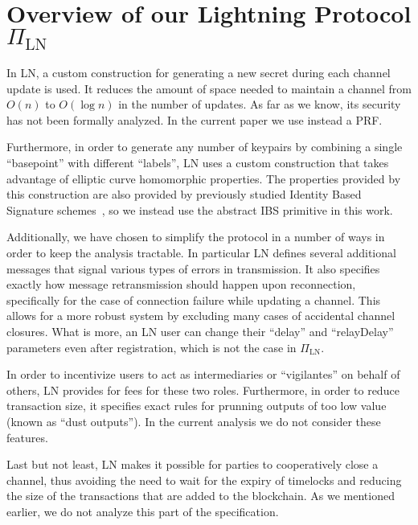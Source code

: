 \section{Overview of our Lightning Protocol $\Pi_{\mathrm{LN}}$}

  \begin{remark}

    In LN, a custom construction for generating a new secret during each channel
    update is used. It reduces the amount of space needed to maintain a channel
    from $O(n)$ to $O(\log n)$ in the number of updates. As far as we know, its
    security has not been formally analyzed. In the current paper we use instead
    a PRF.

    Furthermore, in order to generate any number of keypairs by combining a
    single ``basepoint'' with different ``labels'', LN uses a custom
    construction that takes advantage of elliptic curve homomorphic properties.
    The properties provided by this construction are also provided by previously
    studied Identity Based Signature schemes~\cite{ibsshamir,ibspaterson}, so we
    instead use the abstract IBS primitive in this work. 

    Additionally, we have chosen to simplify the protocol in a number of ways in
    order to keep the analysis tractable. In particular LN defines several
    additional messages that signal various types of errors in transmission. It
    also specifies exactly how message retransmission should happen upon
    reconnection, specifically for the case of connection failure while updating
    a channel. This allows for a more robust system by excluding many cases of
    accidental channel closures. What is more, an LN user can change their
    ``delay'' and ``relayDelay'' parameters even after registration, which is
    not the case in $\Pi_{\mathrm{LN}}$.

    In order to incentivize users to act as intermediaries or ``vigilantes'' on
    behalf of others, LN provides for fees for these two roles. Furthermore, in
    order to reduce transaction size, it specifies exact rules for prunning
    outputs of too low value (known as ``dust outputs''). In the current
    analysis we do not consider these features.

    Last but not least, LN makes it possible for parties to cooperatively close
    a channel, thus avoiding the need to wait for the expiry of timelocks and
    reducing the size of the transactions that are added to the blockchain. As
    we mentioned earlier, we do not analyze this part of the specification.
  \end{remark}
